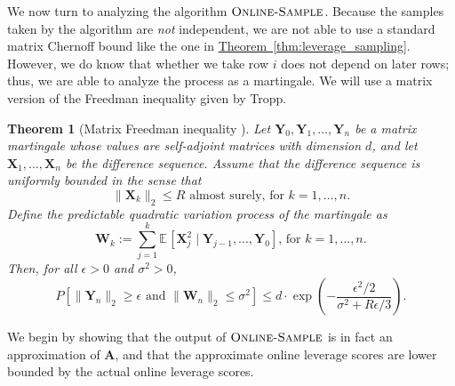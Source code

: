 \documentclass[11pt]{article}
\numberwithin{equation}{section}
\newtheorem{theorem}{Theorem}[section]
\theoremstyle{definition}
\theoremstyle{plain}
\newcommand{\expref}[2]{\hyperref[#2]{#1~\ref{#2}}}
\newcommand{\bv}[1]{\mathbf{#1}}
\newcommand{\norm}[1]{\|#1\|}
\newcommand{\expct}[3]{\mathbb{E}_{{#1}_{#2}}\left[#3\right]}
\newcommand{\prob}[1]{P\left[#1\right]}
\begin{document}
We now turn to analyzing the algorithm $\textsc{Online-Sample}$.
Because the samples taken by the algorithm are \emph{not} independent, we are not able to use a standard matrix Chernoff bound
like the one in \expref{Theorem}{thm:leverage_sampling}.
However, we do know that whether we take row $i$ does not depend on 
later rows; thus, we are able to analyze the process as a martingale.
We will use a matrix version of the Freedman inequality given by Tropp.

\begin{theorem}[Matrix Freedman inequality \cite{tropp11}]
    \label{thm:matrix_freedman}
    Let $\bv{Y}_0, \bv{Y}_1, \ldots, \bv{Y}_n$ be a matrix martingale whose values are self-adjoint matrices with dimension $d$, and let $\bv{X}_1, \ldots, \bv{X}_n$ be the difference sequence.
    Assume that the difference sequence is uniformly bounded in the sense that
    $$
        \norm{\bv{X}_k}_2 \leq R\mbox{ almost surely, for } k = 1, \ldots, n.
    $$
    Define the predictable quadratic variation process of the
    martingale as
    $$
        \bv{W}_k := \sum_{j=1}^k \expct{}{}{\bv{X}_j^2 \mid \bv{Y}_{j-1},\ldots, \bv{Y}_0}\mbox{, for }k = 1, \ldots, n.
    $$
    Then, for all $\epsilon > 0$ and $\sigma^2 > 0$,
    $$
        \prob{\norm{\bv{Y}_n}_2 \geq \epsilon\mbox{ and } \norm{\bv{W}_n}_2 \leq \sigma^2} \leq d\cdot\exp\left(-\frac{\epsilon^2/2}{\sigma^2+R\epsilon/3}\right).
    $$
\end{theorem}

We begin by showing that the output of $\textsc{Online-Sample}$ is in fact an approximation of $\bv{A}$, and that the approximate online leverage scores are lower bounded by the actual online leverage scores.
\end{document}
